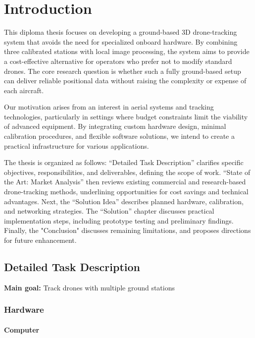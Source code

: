 \chapter{Introduction}

This diploma thesis focuses on developing a ground-based 3D drone-tracking system that avoids the need for specialized onboard hardware. By combining three calibrated stations with local image processing, the system aims to provide a cost-effective alternative for operators who prefer not to modify standard drones. The core research question is whether such a fully ground-based setup can deliver reliable positional data without raising the complexity or expense of each aircraft.

Our motivation arises from an interest in aerial systems and tracking technologies, particularly in settings where budget constraints limit the viability of advanced equipment. By integrating custom hardware design, minimal calibration procedures, and flexible software solutions, we intend to create a practical infrastructure for various applications.

The thesis is organized as follows: “Detailed Task Description” clarifies specific objectives, responsibilities, and deliverables, defining the scope of work. “State of the Art: Market Analysis” then reviews existing commercial and research-based drone-tracking methods, underlining opportunities for cost savings and technical advantages. Next, the “Solution Idea” describes planned hardware, calibration, and networking strategies. The “Solution” chapter discusses practical implementation steps, including prototype testing and preliminary findings. Finally, the "Conclusion" discusses remaining limitations, and proposes directions for future enhancement.

\section{Detailed Task Description}

\textbf{Main goal:} Track drones with multiple ground stations

\subsection{Hardware}

\subsubsection{Computer}

